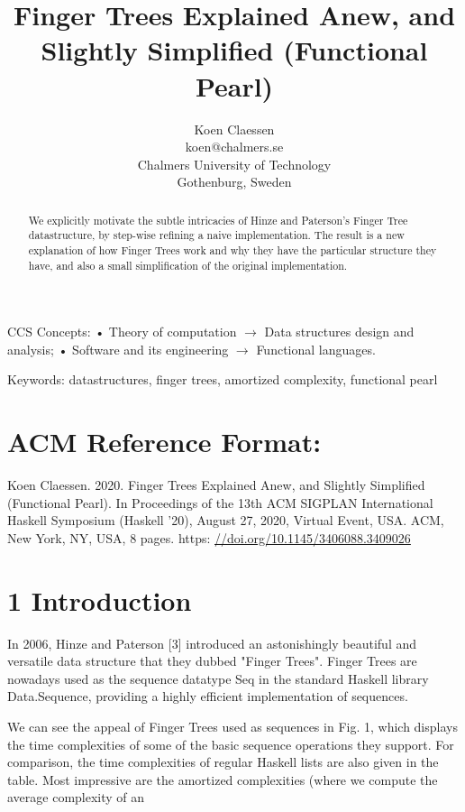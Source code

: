 \documentclass[10pt]{article}
\title{Finger Trees Explained Anew, and Slightly Simplified (Functional Pearl) }
\author{Koen Claessen\\
koen@chalmers.se\\
Chalmers University of Technology\\
Gothenburg, Sweden}
\date{}
\begin{document}
\maketitle


\begin{abstract}
We explicitly motivate the subtle intricacies of Hinze and Paterson's Finger Tree datastructure, by step-wise refining a naive implementation. The result is a new explanation of how Finger Trees work and why they have the particular structure they have, and also a small simplification of the original implementation.
\end{abstract}

CCS Concepts: • Theory of computation $\rightarrow$ Data structures design and analysis; • Software and its engineering $\rightarrow$ Functional languages.

Keywords: datastructures, finger trees, amortized complexity, functional pearl

\section*{ACM Reference Format:}
Koen Claessen. 2020. Finger Trees Explained Anew, and Slightly Simplified (Functional Pearl). In Proceedings of the 13th ACM SIGPLAN International Haskell Symposium (Haskell '20), August 27, 2020, Virtual Event, USA. ACM, New York, NY, USA, 8 pages. https: \href{//doi.org/10.1145/3406088.3409026}{//doi.org/10.1145/3406088.3409026}

\section*{1 Introduction}
In 2006, Hinze and Paterson [3] introduced an astonishingly beautiful and versatile data structure that they dubbed "Finger Trees". Finger Trees are nowadays used as the sequence datatype Seq in the standard Haskell library Data.Sequence, providing a highly efficient implementation of sequences.

We can see the appeal of Finger Trees used as sequences in Fig. 1, which displays the time complexities of some of the basic sequence operations they support. For comparison, the time complexities of regular Haskell lists are also given in the table. Most impressive are the amortized complexities (where we compute the average complexity of an
\end{document}
